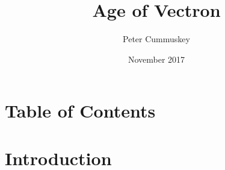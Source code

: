 \documentclass[10pt,twoside,openany]{book}
\title{Age of Vectron}
\author{Peter Cummuskey}
\date{November 2017}
\begin{document}
\maketitle

\chapter{Table of Contents}
\makeatletter
	\let\ps@plain\ps@fancy
\makeatother

\chapter{Introduction}
\begin{multicols}{2}


\end{multicols}
\end{document}
